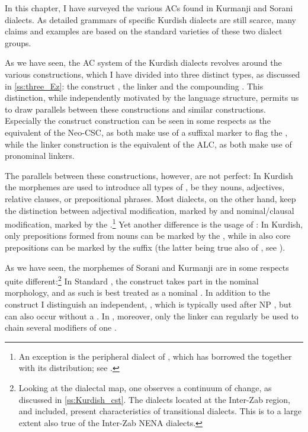 In this chapter, I have surveyed the various ACs found in Kurmanji and Sorani dialects. As detailed grammars of specific Kurdish dialects are still scarce, many claims and examples are based on the standard varieties of these two dialect groups. 

As we have seen, the AC system of the Kurdish dialects revolves around the various \ez* constructions, which I have divided into three distinct types, as discussed in \ref{ss:three_Ez}: the construct \ez*, the linker \ez* and the compounding \ez*. This distinction, while independently motivated by the language structure, permits us to draw parallels between these constructions and similar  constructions. Especially the construct \ez*  construction can be seen in some respects as the equivalent of the  Neo-CSC, as both make use of a suffixal marker to flag the \prim, while the linker \ez* construction is the equivalent of the  ALC, as both make use of pronominal linkers.

The  parallels between these constructions, however, are not perfect: In Kurdish the \ez* morphemes are  used to introduce all types of \secns, be they nouns, adjectives, relative clauses, or prepositional phrases. Most  dialects, on the other hand, keep the  distinction between adjectival modification, marked by  and nominal/clausal modification, marked by the \cst*.\footnote{An exception is the peripheral dialect of \JSan, which has borrowed the  \ez* together with its distribution; see .}  Yet another difference is the usage of  \prims: In Kurdish, only prepositions formed from nouns can be marked by the \ez*, while in  also core prepositions can be marked by the \cst* suffix (the latter being true also of \Per, see \cite[345, example (16)]{SamvelianHead}).






As we have seen, the \ez* morphemes of Sorani and Kurmanji are in some respects quite different:\footnote{Looking at the dialectal map, one observes a continuum of change, as discussed in \ref{ss:Kurdish_cst}. The dialects located at the Inter-Zab region, \Muk and \Bin included, present characteristics of transitional dialects. This is to a large extent also true of the Inter-Zab NENA dialects.} In Standard \Kur, the construct \ez* takes part in the nominal morphology, and as such is best treated as a nominal . In addition to the construct \ez* I distinguish an independent,  \ez*, which is typically used after NP \prims, but can also occur without a \prim. In \Kur, moreover, only the linker \ez* can regularly be used to chain several modifiers of one \prim. 


